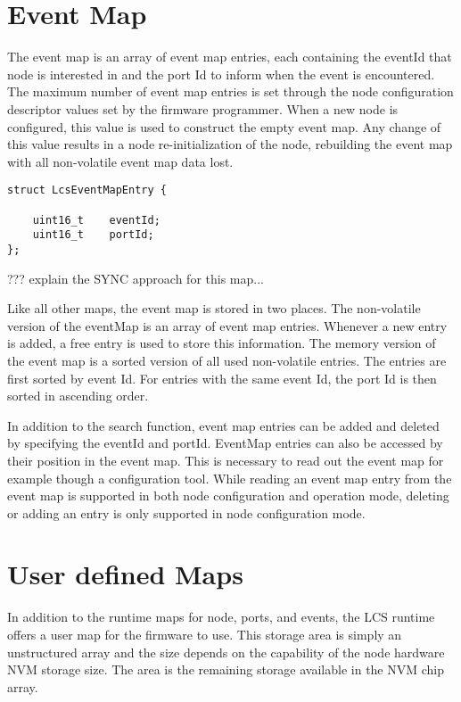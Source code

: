 \section{Event Map}

The event map is an array of event map entries, each containing the eventId that node is interested in and the port Id to inform when the event is encountered. The maximum number of event map entries is set through the node configuration descriptor values set by the firmware programmer. When a new node is configured, this value is used to construct the empty event map. Any change of this value results in a node re-initialization of the node, rebuilding the event map with all non-volatile event map data lost.

\lstset{language=c++, style=codesnippetstyle}
\begin{lstlisting}
struct LcsEventMapEntry {

    uint16_t	eventId;
    uint16_t 	portId;
};
\end{lstlisting}

??? explain the SYNC approach for this map...

Like all other maps, the event map is stored in two places. The non-volatile version of the eventMap is an array of event map entries. Whenever a new entry is added, a free entry is used to store this information. The memory version of the event map is a sorted version of all used non-volatile entries. The entries are first sorted by event Id. For entries with the same event Id, the port Id is then sorted in ascending order.

In addition to the search function, event map entries can be added and deleted by specifying the eventId and portId. EventMap entries can also be accessed by their position in the event map. This is necessary to read out the event map for example though a configuration tool. While reading an event map entry from the event map is supported in both node configuration and operation mode, deleting or adding an entry is only supported in node configuration mode.

\section{User defined Maps}

In addition to the runtime maps for node, ports, and events, the LCS runtime offers a user map for the firmware to use. This storage area is simply an unstructured array and the size depends on the capability of the node hardware NVM storage size. The area is the remaining storage available in the NVM chip array.

